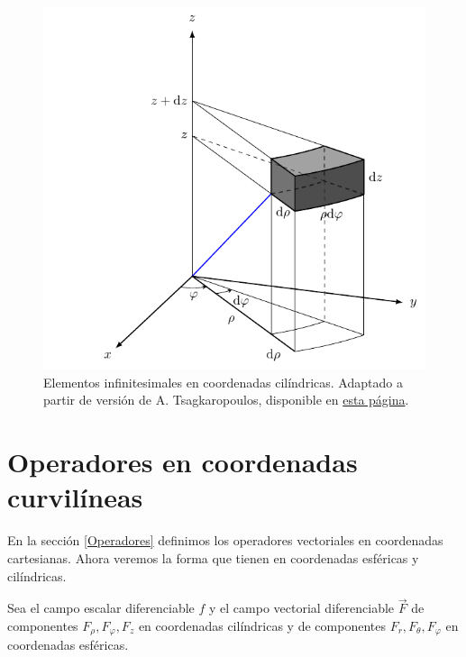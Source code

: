 \begin{figure}[H]
    \centering
    \includegraphics[scale = 1]{Figuras/volumen-cilindricas.pdf}
    \caption{Elementos infinitesimales en coordenadas cilíndricas. Adaptado a partir de versión de A. Tsagkaropoulos, disponible en \href{https://tikz.net/cylindrical_volume/}{esta página}.}
    \label{fig:Vol-Cilindricas}
\end{figure}

\section{Operadores en coordenadas curvilíneas}

En la sección \ref{Operadores} definimos los operadores vectoriales en coordenadas cartesianas. Ahora veremos la forma que tienen en coordenadas esféricas y cilíndricas.

Sea el campo escalar diferenciable $f$ y el campo vectorial diferenciable $\vec{F}$ de componentes $F_{\rho}, F_{\varphi}, F_z$ en coordenadas cilíndricas y de componentes $F_r, F_{\theta}, F_{\varphi}$  en coordenadas esféricas.

